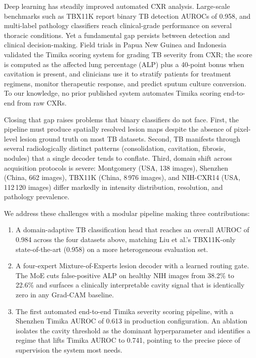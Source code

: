 \documentclass{article}
\begin{document}
Deep learning has steadily improved automated CXR analysis. Large-scale benchmarks such as TBX11K \cite{liu2020tbx11k} report binary TB detection AUROCs of 0.958, and multi-label pathology classifiers \cite{cohen2022torchxrayvision} reach clinical-grade performance on several thoracic conditions. Yet a fundamental gap persists between detection and clinical decision-making. Field trials in Papua New Guinea and Indonesia validated the Timika scoring system \cite{ralph2013timika} for grading TB severity from CXR; the score is computed as the affected lung percentage (ALP) plus a 40-point bonus when cavitation is present, and clinicians use it to stratify patients for treatment regimens, monitor therapeutic response, and predict sputum culture conversion. To our knowledge, no prior published system automates Timika scoring end-to-end from raw CXRs.

Closing that gap raises problems that binary classifiers do not face. First, the pipeline must produce spatially resolved lesion maps despite the absence of pixel-level lesion ground truth on most TB datasets. Second, TB manifests through several radiologically distinct patterns (consolidation, cavitation, fibrosis, nodules) that a single decoder tends to conflate. Third, domain shift across acquisition protocols is severe: Montgomery \cite{jaeger2014shenzhen} (USA, 138 images), Shenzhen \cite{jaeger2014shenzhen} (China, 662 images), TBX11K \cite{liu2020tbx11k} (China, 8\,976 images), and NIH-CXR14 \cite{wang2017nihcxr} (USA, 112\,120 images) differ markedly in intensity distribution, resolution, and pathology prevalence.

We address these challenges with a modular pipeline making three contributions:

\begin{enumerate}
\item A domain-adaptive TB classification head that reaches an overall AUROC of 0.984 across the four datasets above, matching Liu et al.'s TBX11K-only state-of-the-art (0.958) on a more heterogeneous evaluation set.

\item A four-expert Mixture-of-Experts lesion decoder with a learned routing gate. The MoE cuts false-positive ALP on healthy NIH images from 38.2\% to 22.6\% and surfaces a clinically interpretable cavity signal that is identically zero in any Grad-CAM baseline.

\item The first automated end-to-end Timika severity scoring pipeline, with a Shenzhen Timika AUROC of 0.613 in production configuration. An ablation isolates the cavity threshold as the dominant hyperparameter and identifies a regime that lifts Timika AUROC to 0.741, pointing to the precise piece of supervision the system most needs.
\end{enumerate}
\end{document}
